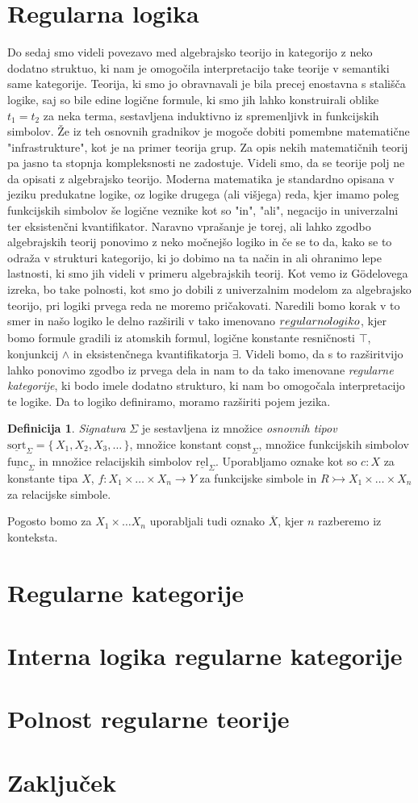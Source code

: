 \documentclass[12pt,a4paper]{book}
\theoremstyle{definition}
\newtheorem{definicija}{Definicija}[chapter]
\theoremstyle{plain}
\theoremstyle{definition}
\theoremstyle{remark}
\renewcommand{\set}[1]{\{\,#1\,\}}
\begin{document}
\section{Regularna logika}
Do sedaj smo videli povezavo med algebrajsko teorijo in kategorijo z neko dodatno struktuo, ki nam je omogočila interpretacijo take teorije v semantiki same kategorije. Teorija, ki smo jo obravnavali je bila precej enostavna s stališča logike, saj so bile edine logične formule, ki smo jih lahko konstruirali oblike $t_1 = t_2$ za neka terma, sestavljena induktivno iz spremenljivk in funkcijskih simbolov. 
Že iz teh osnovnih gradnikov je mogoče dobiti pomembne matematične "infrastrukture", kot je na primer teorija grup. Za opis nekih matematičnih teorij pa jasno ta stopnja kompleksnosti ne zadostuje.
Videli smo, da se teorije polj ne da opisati z algebrajsko teorijo. Moderna matematika je standardno opisana v jeziku predukatne logike, oz logike drugega (ali višjega) reda, kjer imamo poleg funkcijskih simbolov še logične veznike kot so "in", "ali", negacijo in univerzalni ter eksistenčni kvantifikator.
Naravno vprašanje je torej, ali lahko zgodbo algebrajskih teorij ponovimo z neko močnejšo logiko in če se to da, kako se to odraža v strukturi kategorijo, ki jo dobimo na ta način in ali ohranimo lepe lastnosti, ki smo jih videli v primeru algebrajskih teorij.
Kot vemo iz Gödelovega izreka, bo take polnosti, kot smo jo dobili z univerzalnim modelom za algebrajsko teorijo, pri logiki prvega reda ne moremo pričakovati.
Naredili bomo korak v to smer in našo logiko le delno razširili v tako imenovano $\emph{regularno logiko}$, kjer bomo formule gradili iz atomskih formul, logične konstante resničnosti $\top$, konjunkcij $\wedge$ in eksistenčnega kvantifikatorja $\exists$.
Videli bomo, da s to razširitvijo lahko ponovimo zgodbo iz prvega dela in nam to da tako imenovane \emph{regularne kategorije}, ki bodo imele dodatno strukturo, ki nam bo omogočala interpretacijo te logike.
Da to logiko definiramo, moramo razširiti pojem jezika.
%
\begin{definicija}
  \emph{Signatura} $\Sigma$ je sestavljena iz množice \emph{osnovnih tipov} $\underline{\mathrm{sort}}_\Sigma = \set{X_1, X_2, X_3, \ldots}$, množice konstant $\underline{\mathrm{const}}_\Sigma$, množice funkcijskih simbolov $\underline{\mathrm{func}}_\Sigma$ in množice relacijskih simbolov $\underline{\mathrm{rel}}_\Sigma$. Uporabljamo oznake kot so $c : X$ za konstante tipa $X$, $f : X_1 \times \ldots \times X_n \to Y$ za funkcijske simbole in $R \rightarrowtail X_1 \times \ldots \times X_n$ za relacijske simbole.
\end{definicija}
Pogosto bomo za $X_1 \times \ldots X_n$ uporabljali tudi oznako $\overline{X}$, kjer $n$ razberemo iz konteksta.
%
\section{Regularne kategorije}
%
\section{Interna logika regularne kategorije}
%
\section{Polnost regularne teorije}
%
\section{Zaključek}
%
\end{document}

